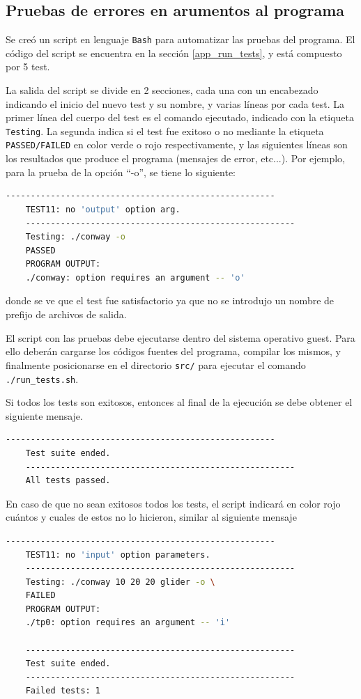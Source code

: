 \documentclass[a4paper,12pt]{article}
\newcommand{\quotes}[1]{``#1''}
\numberwithin{equation}{section}
\numberwithin{figure}{section}
\begin{document}
	
	
	
	\subsection{Pruebas de errores en arumentos al programa}
	
	Se creó un script en lenguaje \texttt{Bash} para automatizar las pruebas del programa.  El código del script se encuentra en la sección \ref{app_run_tests}, y está compuesto por 5 test.
	
	La salida del script se divide en 2 secciones, cada una con un encabezado indicando el inicio del nuevo test y su nombre, y varias líneas por cada test. La primer línea del cuerpo del test es el comando ejecutado, indicado con la etiqueta \texttt{Testing}. La segunda indica si el test fue exitoso o no mediante la etiqueta \texttt{PASSED/FAILED} en color verde o rojo respectivamente, y las siguientes líneas son los resultados que produce el programa (mensajes de error, etc...). Por ejemplo, para la prueba de la opción \quotes{-o}, se tiene lo siguiente:
	\begin{lstlisting}[language=bash, style=StyleC]
	------------------------------------------------------
	TEST11: no 'output' option arg.
	------------------------------------------------------
	Testing: ./conway -o
	PASSED
	PROGRAM OUTPUT:
	./conway: option requires an argument -- 'o'
	\end{lstlisting}
	donde se ve que el test fue satisfactorio ya que no se introdujo un nombre de prefijo de archivos de salida.
	
	El script con las pruebas debe ejecutarse dentro del sistema operativo guest. Para ello deberán cargarse los códigos fuentes del programa, compilar los mismos, y finalmente posicionarse en el directorio \texttt{src/} para ejecutar el comando \texttt{./run\_tests.sh}.
	
	Si todos los tests son exitosos, entonces al final de la ejecución se debe obtener el siguiente mensaje.
	\begin{lstlisting}[language=bash, style=StyleC]
	------------------------------------------------------
	Test suite ended.
	------------------------------------------------------
	All tests passed.
	\end{lstlisting}
	
	En caso de que no sean exitosos todos los tests, el script indicará en color rojo cuántos y cuales de estos no lo hicieron, similar al siguiente mensaje
	\begin{lstlisting}[language=bash, style=StyleC]
	------------------------------------------------------
	TEST11: no 'input' option parameters.
	------------------------------------------------------
	Testing: ./conway 10 20 20 glider -o \
	FAILED 
	PROGRAM OUTPUT:
	./tp0: option requires an argument -- 'i'
	
	------------------------------------------------------
	Test suite ended.
	------------------------------------------------------
	Failed tests: 1
	\end{lstlisting}
	
\end{document}
